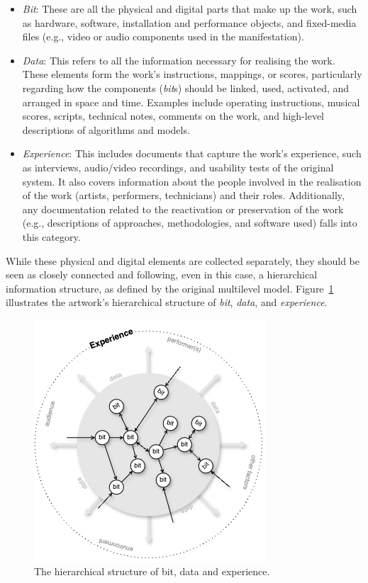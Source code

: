 \begin{itemize}
    \item \textit{Bit}: These are all the physical and digital parts that make up the work, such as hardware, software, installation and performance objects, and fixed-media files (e.g., video or audio components used in the manifestation). 
    \item \textit{Data}: This refers to all the information necessary for realising the work. These elements form the work's instructions, mappings, or scores, particularly regarding how the components (\textit{bit}s) should be linked, used, activated, and arranged in space and time. Examples include operating instructions, musical scores, scripts, technical notes, comments on the work, and high-level descriptions of algorithms and models.
    \item \textit{Experience}: This includes documents that capture the work's experience, such as interviews, audio/video recordings, and usability tests of the original system. It also covers information about the people involved in the realisation of the work (artists, performers, technicians) and their roles. Additionally, any documentation related to the reactivation or preservation of the work (e.g., descriptions of approaches, methodologies, and software used) falls into this category.
\end{itemize}
While these physical and digital elements are collected separately, they should be seen as closely connected and following, even in this case, a hierarchical information structure, as defined by the original multilevel model. Figure~\ref{fig:c3-items} illustrates the artwork's hierarchical structure of \textit{bit}, \textit{data}, and \textit{experience}. 
\begin{figure}[!h]
    \centering
    \includegraphics[width=0.7\linewidth]{chapters/3-mdc_model-reactivation_workflow-instruction_template/image/graph03-items.png}
    \caption{The hierarchical structure of bit, data and experience.}
    \label{fig:c3-items}
\end{figure} 
